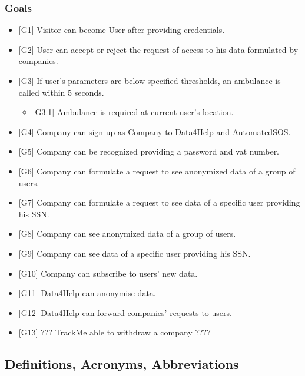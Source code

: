 \documentclass{article}
\begin{document}
\subsubsection{Goals}
\begin{itemize}
	\item {[G1]} Visitor can become User after providing credentials.
	\item {[G2]} User can accept or reject the request of access to his data formulated by companies.
	\item {[G3]} If user's parameters are below specified thresholds, an ambulance is called within 5 seconds. 
	\begin{itemize}
		\item {[G3.1]} Ambulance is required at current user's location. 
	\end{itemize}
	\item {[G4]} Company can sign up as Company to Data4Help and AutomatedSOS. 
	\item {[G5]} Company can be recognized providing a password and vat number.
	\item {[G6]} Company can formulate a request to see anonymized data of a group of users.
	\item {[G7]} Company can formulate a request to see data of a specific user providing his SSN.
	\item {[G8]} Company can see anonymized data of a group of users.
	\item {[G9]} Company can see data of a specific user providing his SSN.
	\item {[G10]} Company can subscribe to users' new data.
	\item {[G11]} Data4Help can anonymise data.
	\item {[G12]} Data4Help can forward companies' requests to users. 
	\item {[G13]} ??? TrackMe able to withdraw a company ????
\end{itemize} 
\subsection{Definitions, Acronyms, Abbreviations}
\end{document}
